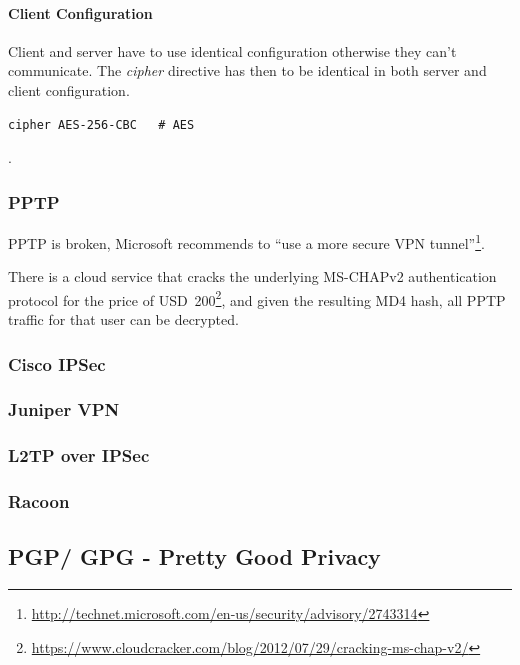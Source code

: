 \paragraph{Client Configuration}

Client and server have to use identical configuration otherwise they can't communicate.
The {\it cipher} directive has then to be identical in both server and client configuration.

\begin{lstlisting}[breaklines]
cipher AES-256-CBC   # AES
\end{lstlisting}

. 

\subsubsection{PPTP}

PPTP is broken, Microsoft recommends to ``use a more secure VPN
tunnel''\footnote{\url{http://technet.microsoft.com/en-us/security/advisory/2743314}}.

There is a cloud service that cracks the underlying MS-CHAPv2
authentication protocol for the price of USD~200\footnote{\url{https://www.cloudcracker.com/blog/2012/07/29/cracking-ms-chap-v2/}},
and given the resulting MD4 hash, all PPTP traffic for that user can
be decrypted.

\subsubsection{Cisco IPSec}

\subsubsection{Juniper VPN}

\subsubsection{L2TP over IPSec}

\subsubsection{Racoon}


\subsection{PGP/ GPG - Pretty Good Privacy}

